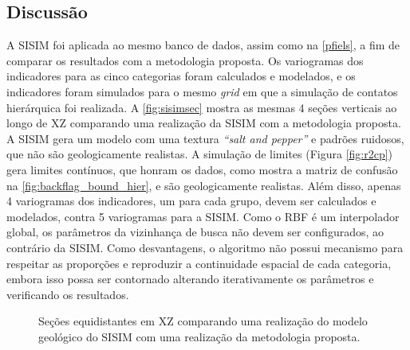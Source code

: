 \subsection{Discussão}

A SISIM foi aplicada ao mesmo banco de dados, assim como na \autoref{pfiels}, a fim de comparar os resultados com a metodologia proposta. Os variogramas dos indicadores para as cinco categorias foram calculados e modelados, e os indicadores foram simulados para o mesmo \textit{grid} em que a simulação de contatos hierárquica foi realizada. A \autoref{fig:sisimsec} mostra as mesmas 4 seções verticais ao longo de XZ comparando uma realização da SISIM com a metodologia proposta. A SISIM gera um modelo com uma textura \textit{“salt and pepper”} e padrões ruidosos, que não são geologicamente realistas. A simulação de limites (Figura \autoref{fig:r2cp}) gera limites contínuos, que honram os dados, como mostra a matriz de confusão na \autoref{fig:backflag_bound_hier}, e são geologicamente realistas. Além disso, apenas 4 variogramas dos indicadores, um para cada grupo, devem ser calculados e modelados, contra 5 variogramas para a SISIM. Como o RBF é um interpolador global, os parâmetros da vizinhança de busca não devem ser configurados, ao contrário da SISIM. Como desvantagens, o algoritmo não possui mecanismo para respeitar as proporções e reproduzir a continuidade espacial de cada categoria, embora isso possa ser contornado alterando iterativamente os parâmetros e verificando os resultados.

\begin{figure}[H]
    \caption{Seções equidistantes em XZ comparando uma realização do modelo geológico do SISIM com uma realização da metodologia proposta.} \label{fig:cs_reals}
     \centering
     \hspace{1em}
\end{figure}


